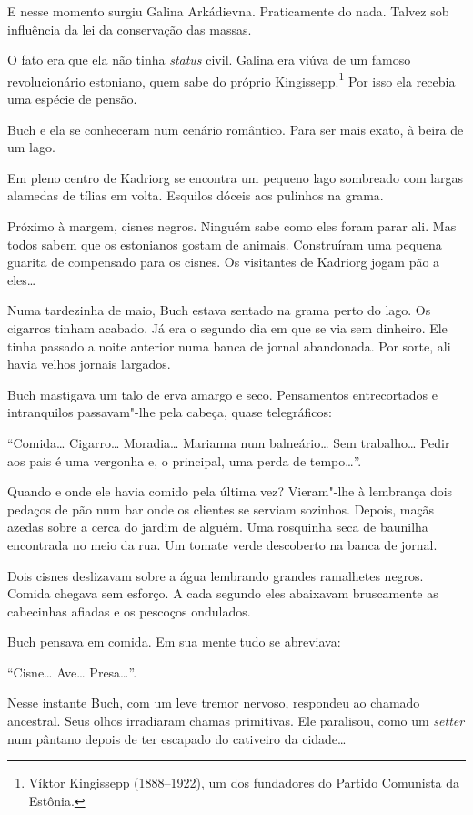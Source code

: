 E nesse momento surgiu Galina Arkádievna. Praticamente do nada. Talvez
sob influência da lei da conservação das massas.

O fato era que ela não tinha \emph{status} civil. Galina era viúva de um
famoso revolucionário estoniano, quem sabe do próprio
Kingissepp.\footnote{Víktor Kingissepp (1888--1922), um dos fundadores
  do Partido Comunista da Estônia.} Por isso ela recebia uma espécie de
pensão.

Buch e ela se conheceram num cenário romântico. Para ser mais exato, à
beira de um lago.

Em pleno centro de Kadriorg se encontra um pequeno lago sombreado com
largas alamedas de tílias em volta. Esquilos dóceis aos pulinhos na
grama.

Próximo à margem, cisnes negros. Ninguém sabe como eles foram parar ali.
Mas todos sabem que os estonianos gostam de animais. Construíram uma
pequena guarita de compensado para os cisnes. Os visitantes de Kadriorg
jogam pão a eles\ldots{}

Numa tardezinha de maio, Buch estava sentado na grama perto do lago. Os
cigarros tinham acabado. Já era o segundo dia em que se via sem
dinheiro. Ele tinha passado a noite anterior numa banca de jornal
abandonada. Por sorte, ali havia velhos jornais largados.

Buch mastigava um talo de erva amargo e seco. Pensamentos entrecortados
e intranquilos passavam"-lhe pela cabeça, quase telegráficos:

``Comida\ldots{} Cigarro\ldots{} Moradia\ldots{} Marianna num balneário\ldots{} Sem
trabalho\ldots{} Pedir aos pais é uma vergonha e, o principal, uma perda de
tempo\ldots{}''.

Quando e onde ele havia comido pela última vez? Vieram"-lhe à lembrança
dois pedaços de pão num bar onde os clientes se serviam sozinhos.
Depois, maçãs azedas sobre a cerca do jardim de alguém. Uma rosquinha
seca de baunilha encontrada no meio da rua. Um tomate verde descoberto
na banca de jornal.

Dois cisnes deslizavam sobre a água lembrando grandes ramalhetes negros.
Comida chegava sem esforço. A cada segundo eles abaixavam bruscamente as
cabecinhas afiadas e os pescoços ondulados.

Buch pensava em comida. Em sua mente tudo se abreviava:

``Cisne\ldots{} Ave\ldots{} Presa\ldots{}''.

Nesse instante Buch, com um leve tremor nervoso, respondeu ao chamado
ancestral. Seus olhos irradiaram chamas primitivas. Ele paralisou, como
um \emph{setter} num pântano depois de ter escapado do cativeiro da
cidade\ldots{}

